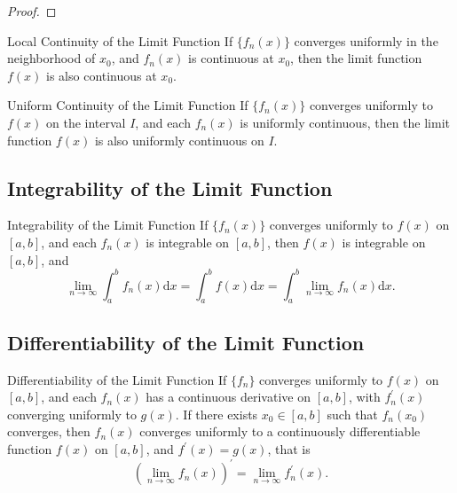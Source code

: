\begin{proof}
  
\end{proof}

\begin{theorem}{Local Continuity of the Limit Function}{}
  If $\{f_n(x)\}$ converges uniformly in the neighborhood of $x_0$,
  and $f_n(x)$ is continuous at $x_0$, then the limit function $f(x)$
  is also continuous at $x_0$.
\end{theorem}

\begin{theorem}{Uniform Continuity of the Limit Function}{}
  If $\{f_n(x)\}$ converges uniformly to $f(x)$ on the interval $I$,
  and each $f_n(x)$ is uniformly continuous,
  then the limit function $f(x)$ is also uniformly continuous on $I$.
\end{theorem}

\subsection{Integrability of the Limit Function}

\begin{theorem}{Integrability of the Limit Function}{}
  If $\{f_n(x)\}$ converges uniformly to $f(x)$ on $[a, b]$,
  and each $f_n(x)$ is integrable on $[a, b]$,
  then $f(x)$ is integrable on $[a, b]$, and
  \begin{equation}
    \lim \limits _{n \rightarrow \infty} \int_a^b f_n(x) \mathrm{d} x 
    = \int_a^b f(x)\mathrm{d} x = \int_a^b \lim \limits _{n \rightarrow \infty} f_n(x) \mathrm{d} x.
  \end{equation}
\end{theorem}



\subsection{Differentiability of the Limit Function}

\begin{theorem}{Differentiability of the Limit Function}{}
  If $\{f_n\}$ converges uniformly to $f(x)$ on $[a, b]$,
  and each $f_n(x)$ has a continuous derivative on $[a, b]$,
  with $f_n^{\prime}(x)$ converging uniformly to $g(x)$.
  If there exists $x_0 \in [a, b]$ such that $f_n(x_0)$ converges,
  then $f_n(x)$ converges uniformly to a continuously differentiable function $f(x)$
  on $[a, b]$, and $f^{\prime}(x) = g(x)$, that is
  \begin{equation}
    (\lim \limits _{n \rightarrow \infty} f_n(x))^{\prime}
    = \lim \limits _{n \rightarrow \infty} f_n^{\prime}(x).
  \end{equation}
\end{theorem}


